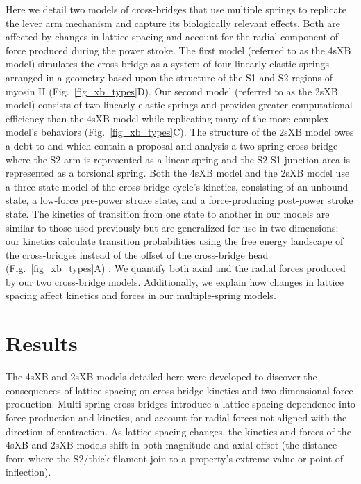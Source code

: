 \documentclass[10pt]{article}
\newcommand{\citep}[1]{\cite{#1}} %
\newcommand{\citet}[1]{\cite{#1}}
\begin{document}
Here we detail two models of cross-bridges that use multiple springs to replicate the lever arm mechanism and capture its biologically relevant effects.  
Both are affected by changes in lattice spacing and account for the radial component of force produced during the power stroke.  
The first model (referred to as the 4sXB model) simulates the cross-bridge as a system of four linearly elastic springs arranged in a geometry based upon the structure of the S1 and S2 regions of myosin II (Fig.~\ref{fig_xb_types}D).  
Our second model (referred to as the 2sXB model) consists of two linearly elastic springs and provides greater computational efficiency than the 4sXB model while replicating many of the more complex model's behaviors (Fig.~\ref{fig_xb_types}C). 
The structure of the 2sXB model owes a debt to \citet{Schoenberg1980a} and \citet{Schoenberg1980b} which contain a proposal and analysis a two spring cross-bridge where the S2 arm is represented as a linear spring and the S2-S1 junction area is represented as a torsional spring. 
Both the 4sXB model and the 2sXB model use a three-state model of the cross-bridge cycle's kinetics, consisting of an unbound state, a low-force pre-power stroke state, and a force-producing post-power stroke state. 
The kinetics of transition from one state to another in our models are similar to those used previously but are generalized for use in two dimensions; our kinetics calculate transition probabilities using the free energy landscape of the cross-bridges instead of the offset of the cross-bridge head (Fig.~\ref{fig_xb_types}A) \citep{Pate1989, Daniel1998, Takagi2004, Tanner2007}. 
We quantify both axial and the radial forces produced by our two cross-bridge models. 
Additionally, we explain how changes in lattice spacing affect kinetics and forces in our multiple-spring models. 


\section*{Results} %

The 4sXB and 2sXB models detailed here were developed to discover the consequences of lattice spacing on cross-bridge kinetics and two dimensional force production.
Multi-spring cross-bridges introduce a lattice spacing dependence into force production and kinetics, and account for radial forces not aligned with the direction of contraction. 
As lattice spacing changes, the kinetics and forces of the 4sXB and 2sXB models shift in both magnitude and axial offset (the distance from where the S2/thick filament join to a property's extreme value or point of inflection).
\end{document}
